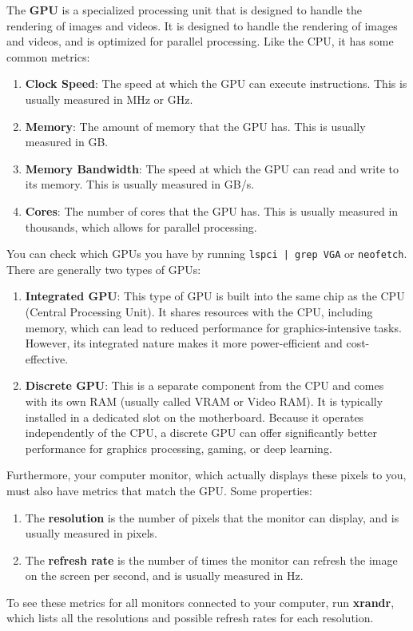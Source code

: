   \begin{definition}
    The \textbf{GPU} is a specialized processing unit that is designed to handle the rendering of images and videos. It is designed to handle the rendering of images and videos, and is optimized for parallel processing. Like the CPU, it has some common metrics: 
    \begin{enumerate} 
      \item \textbf{Clock Speed}: The speed at which the GPU can execute instructions. This is usually measured in MHz or GHz. 
      \item \textbf{Memory}: The amount of memory that the GPU has. This is usually measured in GB. 
      \item \textbf{Memory Bandwidth}: The speed at which the GPU can read and write to its memory. This is usually measured in GB/s. 
      \item \textbf{Cores}: The number of cores that the GPU has. This is usually measured in thousands, which allows for parallel processing. 
    \end{enumerate}
    You can check which GPUs you have by running \texttt{lspci | grep VGA} or \texttt{neofetch}. There are generally two types of GPUs: 
    \begin{enumerate} 
      \item \textbf{Integrated GPU}: This type of GPU is built into the same chip as the CPU (Central Processing Unit). It shares resources with the CPU, including memory, which can lead to reduced performance for graphics-intensive tasks. However, its integrated nature makes it more power-efficient and cost-effective. 
      \item \textbf{Discrete GPU}: This is a separate component from the CPU and comes with its own RAM (usually called VRAM or Video RAM). It is typically installed in a dedicated slot on the motherboard. Because it operates independently of the CPU, a discrete GPU can offer significantly better performance for graphics processing, gaming, or deep learning. 
    \end{enumerate}
  \end{definition}

  \begin{definition}[Monitor]
    Furthermore, your computer monitor, which actually displays these pixels to you, must also have metrics that match the GPU. Some properties: 
    \begin{enumerate} 
      \item The \textbf{resolution} is the number of pixels that the monitor can display, and is usually measured in pixels. 
      \item The \textbf{refresh rate} is the number of times the monitor can refresh the image on the screen per second, and is usually measured in Hz. 
    \end{enumerate}
    To see these metrics for all monitors connected to your computer, run \textbf{xrandr}, which lists all the resolutions and possible refresh rates for each resolution. 
  \end{definition}

